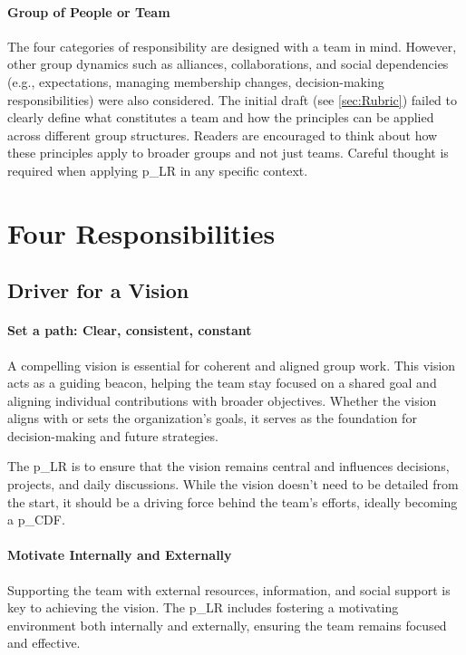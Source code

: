 \paragraph{Group of People or Team}
The four categories of responsibility are designed with a team in mind. However, other group dynamics such as alliances, collaborations, and social dependencies (e.g., expectations, managing membership changes, decision-making responsibilities) were also considered. The initial draft (see \ref{sec:Rubric}) failed to clearly define what constitutes a team and how the principles can be applied across different group structures. Readers are encouraged to think about how these principles apply to broader groups and not just teams. Careful thought is required when applying \gls{p_LR} in any specific context.

\section{Four Responsibilities}

\subsection{Driver for a Vision}\label{responsibility__driver}
\paragraph{Set a path: Clear, consistent, constant}

A compelling vision is essential for coherent and aligned group work. This vision acts as a guiding beacon, helping the team stay focused on a shared goal and aligning individual contributions with broader objectives. Whether the vision aligns with or sets the organization's goals, it serves as the foundation for decision-making and future strategies.

The \gls{p_LR} is to ensure that the vision remains central and influences decisions, projects, and daily discussions. While the vision doesn’t need to be detailed from the start, it should be a driving force behind the team's efforts, ideally becoming a \gls{p_CDF}.

\paragraph{Motivate Internally and Externally}
Supporting the team with external resources, information, and social support is key to achieving the vision. The \gls{p_LR} includes fostering a motivating environment both internally and externally, ensuring the team remains focused and effective.


